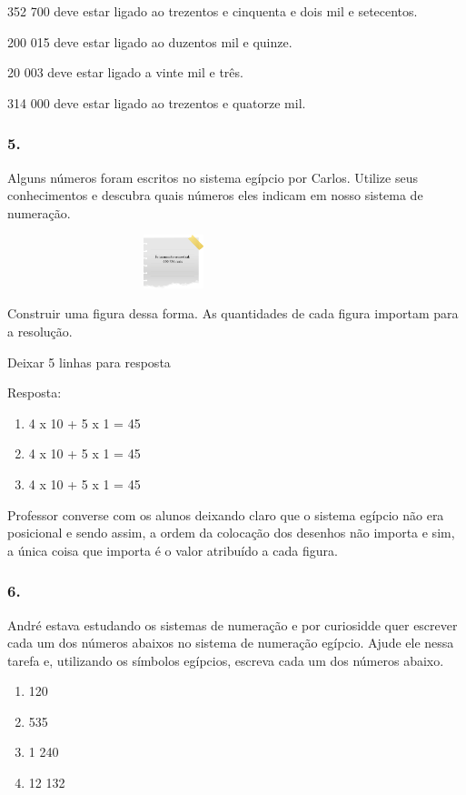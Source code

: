 352 700 deve estar ligado ao trezentos e cinquenta e dois mil e
setecentos.

200 015 deve estar ligado ao duzentos mil e quinze.

20 003 deve estar ligado a vinte mil e três.

314 000 deve estar ligado ao trezentos e quatorze mil.

\subsubsection{5.}\label{section-4}

Alguns números foram escritos no sistema egípcio por Carlos. Utilize
seus conhecimentos e descubra quais números eles indicam em nosso
sistema de numeração.

\includegraphics[width=3.80866in,height=0.60839in]{media/image8.png}

Construir uma figura dessa forma. As quantidades de cada figura importam
para a resolução.

Deixar 5 linhas para resposta

Resposta:

\begin{enumerate}
\def\labelenumi{\alph{enumi})}
\item
  4 x 10 + 5 x 1 = 45
\item
  4 x 10 + 5 x 1 = 45
\item
  4 x 10 + 5 x 1 = 45
\end{enumerate}

Professor converse com os alunos deixando claro que o sistema egípcio
não era posicional e sendo assim, a ordem da colocação dos desenhos não
importa e sim, a única coisa que importa é o valor atribuído a cada
figura.

\subsubsection{6.}\label{section-5}

André estava estudando os sistemas de numeração e por curiosidde quer
escrever cada um dos números abaixos no sistema de numeração egípcio.
Ajude ele nessa tarefa e, utilizando os símbolos egípcios, escreva cada
um dos números abaixo.

\begin{enumerate}
\def\labelenumi{\alph{enumi})}
\item
  120
\item
  535
\item
  1 240
\item
  12 132
\end{enumerate}

